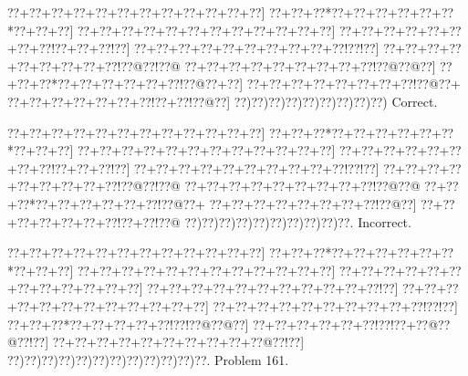 \documentclass[a5paper]{article}
\begin{document}
\begin{center}
{\goo
\0??+\0??+\0??+\0??+\0??+\0??+\0??+\0??+\0??+\0??+\0??+\0??]
\0??+\0??+\0??*\0??+\0??+\0??+\0??+\0??+\0??*\0??+\0??+\0??]
\0??+\0??+\0??+\0??+\0??+\0??+\0??+\0??+\0??+\0??+\0??+\0??]
\0??+\0??+\0??+\0??+\0??+\0??+\0??+\0??!\0??+\0??+\0??!\0??]
\0??+\0??+\0??+\0??+\0??+\0??+\0??+\0??+\0??+\0??!\0??!\0??]
\0??+\0??+\0??+\0??+\0??+\0??+\0??+\0??+\0??!\0??@\0??!\0??@
\0??+\0??+\0??+\0??+\0??+\0??+\0??+\0??+\0??!\0??@\0??@\0??]
\0??+\0??+\0??*\0??+\0??+\0??+\0??+\0??+\0??!\0??@\0??+\0??]
\0??+\0??+\0??+\0??+\0??+\0??+\0??+\0??!\0??@\0??+
\0??+\0??+\0??+\0??+\0??+\0??+\0??!\0??+\0??!\0??@\0??]
\0??)\0??)\0??)\0??)\0??)\0??)\0??)\0??)\0??)
}
Correct. 

\end{center}
\begin{center}
{\goo
\0??+\0??+\0??+\0??+\0??+\0??+\0??+\0??+\0??+\0??+\0??+\0??]
\0??+\0??+\0??*\0??+\0??+\0??+\0??+\0??+\0??*\0??+\0??+\0??]
\0??+\0??+\0??+\0??+\0??+\0??+\0??+\0??+\0??+\0??+\0??+\0??]
\0??+\0??+\0??+\0??+\0??+\0??+\0??+\0??!\0??+\0??+\0??!\0??]
\0??+\0??+\0??+\0??+\0??+\0??+\0??+\0??+\0??+\0??!\0??!\0??]
\0??+\0??+\0??+\0??+\0??+\0??+\0??+\0??+\0??!\0??@\0??!\0??@
\0??+\0??+\0??+\0??+\0??+\0??+\0??+\0??+\0??!\0??@\0??@
\0??+\0??+\0??*\0??+\0??+\0??+\0??+\0??+\0??!\0??@\0??+
\0??+\0??+\0??+\0??+\0??+\0??+\0??+\0??!\0??@\0??]
\0??+\0??+\0??+\0??+\0??+\0??+\0??!\0??+\0??!\0??@
\0??)\0??)\0??)\0??)\0??)\0??)\0??)\0??)\0??)\0??.
}
Incorrect. 

\end{center}
\newpage
\begin{center}
{\goo
\0??+\0??+\0??+\0??+\0??+\0??+\0??+\0??+\0??+\0??+\0??+\0??]
\0??+\0??+\0??*\0??+\0??+\0??+\0??+\0??+\0??*\0??+\0??+\0??]
\0??+\0??+\0??+\0??+\0??+\0??+\0??+\0??+\0??+\0??+\0??+\0??]
\0??+\0??+\0??+\0??+\0??+\0??+\0??+\0??+\0??+\0??+\0??+\0??]
\0??+\0??+\0??+\0??+\0??+\0??+\0??+\0??+\0??+\0??+\0??!\0??]
\0??+\0??+\0??+\0??+\0??+\0??+\0??+\0??+\0??+\0??+\0??+\0??]
\0??+\0??+\0??+\0??+\0??+\0??+\0??+\0??+\0??+\0??!\0??!\0??]
\0??+\0??+\0??*\0??+\0??+\0??+\0??+\0??!\0??!\0??@\0??@\0??]
\0??+\0??+\0??+\0??+\0??+\0??!\0??!\0??+\0??@\0??@\0??!\0??]
\0??+\0??+\0??+\0??+\0??+\0??+\0??+\0??+\0??+\0??@\0??!\0??]
\0??)\0??)\0??)\0??)\0??)\0??)\0??)\0??)\0??)\0??)\0??)\0??.
}
Problem 161.

\end{center}
\end{document}
